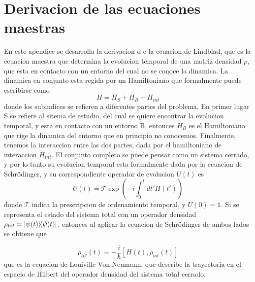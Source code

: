 \chapter{Derivacion de las ecuaciones maestras}
\label{ap_ecsmaestras}

\pagestyle{fancy}
\fancyhf{}
\fancyhead[LE]{\nouppercase{\rightmark\hfill}}
\fancyhead[RO]{\nouppercase{\leftmark\hfill}}
\fancyfoot[LE,RO]{\hfill\thepage\hfill}

En este apendice se desarrolla la derivacion d
e la ecuacion de Lindblad, que es la ecuacion maestra que determina la evolucion temporal de una matriz densidad $\rho$, que esta en contacto con un entorno del cual no se conoce la dinamica. La dinamica en conjunto esta regida por un Hamiltoniano que formalmente puede escribirse como
\begin{equation}
    H=H_S+H_B+H_{int}
\end{equation}
donde los subindices se refieren a diferentes partes del problema. En primer lugar S se refiere al sitema de estudio, del cual se quiere encontrar la evolucion temporal, y esta en contacto con un entorno B, entonces $H_B$ es el Hamiltoniano que rige la dinamica del entorno que en principio no conocemos. Finalmente, tenemos la interaccion entre las dos partes, dada por el hamiltoniano de interaccion $H_{int}$.
El conjunto completo se puede pensar como un sistema cerrado, y por lo tanto su evolucion temporal esta formalmente dada por la ecuacion de Schr\"odinger, y su correspondiente operador de evolucion $U(t)$ es
\begin{equation}
    U(t)=\mathcal{T}\exp\left( -i\int_{0}^{t}dt'H(t') \right)
\end{equation}
donde $\mathcal{T}$ indica la prescripcion de ordenamiento temporal, y $U(0)=\mathbb{1}$. Si se representa el estado del sistema total con un operador densidad $\rho_{tot}=\ketbra{\psi(t)}{\psi(t)}$, entonces al aplicar la ecuacion de Schr\"odinger de ambos lados se obtiene que 

\begin{equation}
    \dot\rho_{tot}(t)=-\frac{i}{\hbar}[H(t),\rho_{tot}(t)]
\end{equation}
que es la ecuacion de Louiville-Von Neumann, que describe la trayectoria en el espacio de Hilbert del operador densidad del sistema total cerrado.

